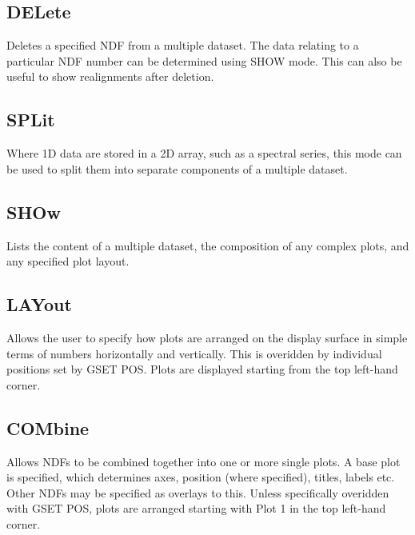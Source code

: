 \documentclass{book}
\renewcommand{\_}{{\tt\char'137}}     %
\begin{document}
\subsection{DELete}
Deletes a specified NDF from a multiple dataset. The data relating
to a particular NDF number can be determined using SHOW mode. This
can also be useful to show realignments after deletion.

\subsection{SPLit}
Where 1D data are stored in a 2D array, such as a spectral series,
this mode can be used to split them into separate components of a
multiple dataset.

\subsection{SHOw}
Lists the content of a multiple dataset, the composition of any
complex plots, and any specified plot layout.

\subsection{LAYout}
Allows the user to specify how plots are arranged on the display
surface in simple terms of numbers horizontally and vertically.
This is overidden by individual positions set by GSET POS. Plots
are displayed starting from the top left-hand corner.

\subsection{COMbine}
Allows NDFs to be combined together into one or more single plots.
A base plot is specified, which determines axes, position (where
specified), titles, labels etc. Other NDFs may be specified as
overlays to this. Unless specifically overidden with GSET POS,
plots are arranged starting with Plot 1 in the top left-hand
corner.
\end{document}
